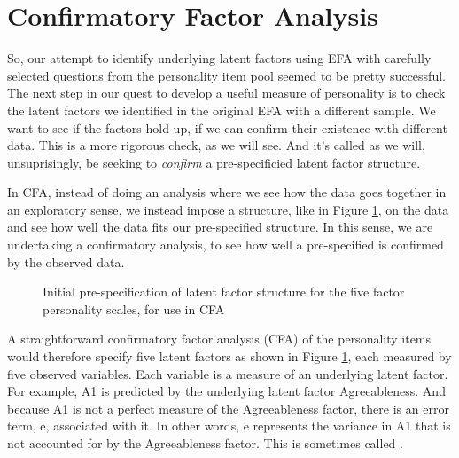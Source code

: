 \section{Confirmatory Factor Analysis~\label{sec:CFA}}

So, our attempt to identify underlying latent factors using EFA with carefully selected questions from the personality item pool seemed to be pretty successful.  The next step in our quest to develop a useful measure of personality is to check the latent factors we identified in the original EFA with a different sample. We want to see if the factors hold up, if we can confirm their existence with different data. This is a more rigorous check, as we will see. And it's called  as we will, unsuprisingly, be seeking to {\it confirm} a pre-specificied latent factor structure.

In CFA, instead of doing an analysis where we see how the data goes together in an exploratory sense, we instead impose a structure, like in Figure \ref{fig:cfa1}, on the data and see how well the data fits our pre-specified structure. In this sense, we are undertaking a confirmatory analysis, to see how well a pre-specified  is confirmed by the observed data.

\begin{figure}[!htp]
\begin{center}
\caption{Initial pre-specification of latent factor structure for the five factor personality scales, for use in CFA}
\label{fig:cfa1}
\HR
\end{center}
\end{figure}

A straightforward confirmatory factor analysis (CFA) of the personality items would therefore specify five latent factors as shown in Figure \ref{fig:cfa1}, each measured by five observed variables. Each variable is a measure of an underlying latent factor. For example, A1 is predicted by the underlying latent factor Agreeableness. And because A1 is not a perfect measure of the Agreeableness factor, there is an error term, e, associated with it. In other words, e represents the variance in A1 that is not accounted for by the Agreeableness factor. This is sometimes called .

